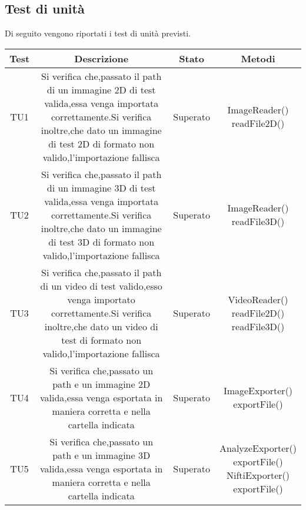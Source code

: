 
\subsection{Test di unità }
\label{testdiunita}

Di seguito vengono riportati i test di unità  previsti.

\newdimen\larghezza
\setlength{\larghezza}{6cm}
\newdimen\dimTipo
\setlength{\dimTipo}{5cm}
\begin{center}
\begin{longtable}{|c|c|c|c|}
\hline

\textbf{Test} & \textbf{Descrizione} & \textbf{Stato} & \textbf{Metodi} \\


\hline
TU1 & \parbox[t]{\larghezza}{ Si verifica che,passato il path di un immagine 2D di test valida,essa venga importata correttamente.Si verifica inoltre,che dato un immagine di test 2D di formato non valido,l'importazione fallisca } & Superato & \parbox[t]{\dimTipo} { ImageReader() \\ readFile2D() \\ } \\
\hline
TU2 & \parbox[t]{\larghezza}{ Si verifica che,passato il path di un immagine 3D di test valida,essa venga importata correttamente.Si verifica inoltre,che dato un immagine di test 3D di formato non valido,l'importazione fallisca } & Superato & \parbox[t]{\dimTipo} { ImageReader() \\ readFile3D() \\ } \\
\hline
TU3 & \parbox[t]{\larghezza}{ Si verifica che,passato il path di un video di test valido,esso venga importato correttamente.Si verifica inoltre,che dato un video di test di formato non valido,l'importazione fallisca } & Superato & \parbox[t]{\dimTipo} { VideoReader() \\ readFile2D() \\ readFile3D() \\ } \\
\hline
TU4 & \parbox[t]{\larghezza}{ Si verifica che,passato un path e un immagine 2D valida,essa venga esportata in maniera corretta e nella cartella indicata } & Superato & \parbox[t]{\dimTipo} { ImageExporter() \\ exportFile() \\ } \\
\hline
TU5 & \parbox[t]{\larghezza}{ Si verifica che,passato un path e un immagine 3D valida,essa venga esportata in maniera corretta e nella cartella indicata } & Superato & \parbox[t]{\dimTipo} { AnalyzeExporter() \\ exportFile() \\ NiftiExporter() \\ exportFile() \\ } \\

\end{longtable}
\end{center}

